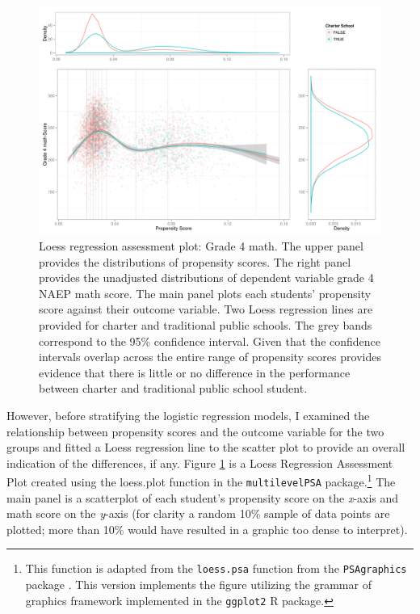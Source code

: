 \documentclass[letterpaper,12p,twoside]{article} %
\begin{document}
\setlength{\belowcaptionskip}{-10pt}
\begin{figure}[t]
\begin{center}
\includegraphics[width=\textwidth]{../Figures2009/g4math-loess.pdf}
\caption[Loess regression assessment plot: Grade 4 math]{Loess regression assessment plot: Grade 4 math. The upper panel provides the distributions of propensity scores. The right panel provides the unadjusted distributions of dependent variable grade 4 NAEP math score. The main panel plots each students' propensity score against their outcome variable. Two Loess regression lines are provided for charter and traditional public schools. The grey bands correspond to the 95\% confidence interval. Given that the confidence intervals overlap across the entire range of propensity scores provides evidence that there is little or no difference in the performance between charter and traditional public school student.}
\label{fig:g4math:loess}
\end{center}
\end{figure}
\setlength{\belowcaptionskip}{0pt}

However, before stratifying the logistic regression models, I examined the relationship between propensity scores and the outcome variable for the two groups and fitted a Loess regression line to the scatter plot to provide an overall indication of the differences, if any. Figure \ref{fig:g4math:loess} is a Loess Regression Assessment Plot created using the loess.plot function in the \texttt{multilevelPSA} package.\footnote{This function is adapted from the \texttt{loess.psa} function from the \texttt{PSAgraphics} package \cite{HelmreichPruzek2009}. This version implements the figure utilizing the grammar of graphics framework \cite{Wilkinson2005} implemented in the  \texttt{ggplot2} \cite{Wickham2009} R package.} The main panel is a scatterplot of each student's propensity score on the \textit{x}-axis and math score on the \textit{y}-axis (for clarity a random 10\% sample of data points are plotted; more than 10\% would have resulted in a graphic too dense to interpret). 
\end{document}
